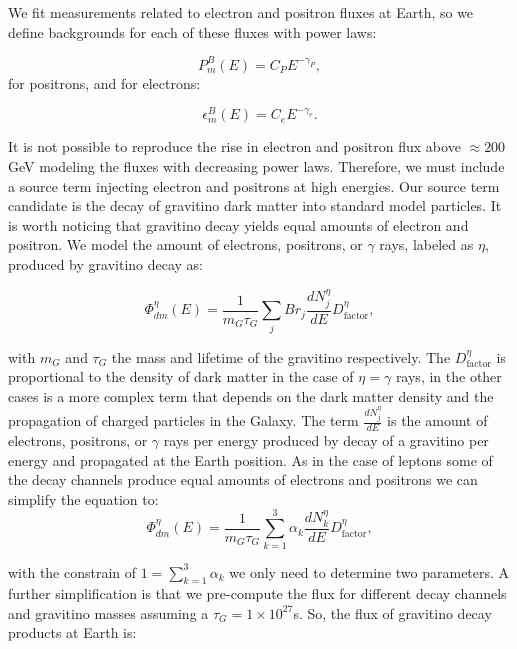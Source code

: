 \documentclass[a4paper,11pt]{article}
\begin{document}
We fit measurements related to electron and positron fluxes at Earth, so we define backgrounds for each of these fluxes with power laws:

\begin{equation}
P_m^B(E) = C_P E^{-\gamma_P}, 
\end{equation}
for positrons, and for electrons:

\begin{equation}
\epsilon_m^B(E) = C_e E^{-\gamma_e}.
\end{equation}

It is not possible to reproduce the rise in electron and positron flux above $\approx 200$ GeV modeling the fluxes with decreasing power laws. Therefore, we must include a source term injecting electron and positrons at high energies. Our source term candidate is the decay of gravitino dark matter into standard model particles. It is worth noticing that gravitino decay yields equal amounts of electron and positron. We model the amount of electrons, positrons, or $\gamma$ rays, labeled as $\eta$, produced by gravitino decay as:

\begin{equation}
\Phi_{dm}^{\eta}(E) = \frac{1}{m_G \tau_G} \sum_j{Br_j \frac{dN_j^{\eta}}{dE}} D^{\eta}_{\text{factor}},
 \end{equation}

with $m_G$ and $\tau_G$ the mass and lifetime of the gravitino respectively. The $D^{\eta}_{\text{factor}}$ is proportional to the density of dark matter in the case of $\eta=\gamma$ rays, in the other cases is a more complex term that depends on the dark matter density and the propagation of charged particles in the Galaxy. The term $\frac{dN_j^{\eta}}{dE}$ is the amount of electrons, positrons, or $\gamma$ rays per energy produced by decay of a gravitino per energy and propagated at the Earth position. As in the case of leptons some of the decay channels produce equal amounts of electrons and positrons we can simplify the equation to:
\begin{equation}
\Phi_{dm}^{\eta}(E) = \frac{1}{m_G \tau_G} \sum_{k=1}^3{\alpha_k \frac{dN_k^{\eta}}{dE}} D^{\eta}_{\text{factor}},
 \end{equation}
 
 with the constrain of $1=\sum_{k=1}^3{\alpha_k}$ we only need to determine two parameters. A further simplification is that we pre-compute the flux for different decay channels and gravitino masses assuming a $ \tau_G = 1\times 10^{27}$s. So, the flux of gravitino decay products at Earth is:
 
\end{document}
